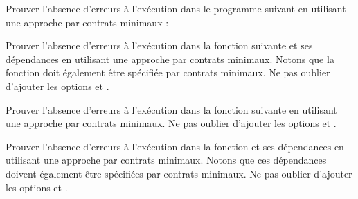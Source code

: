 



Prouver l'absence d'erreurs à l'exécution dans le programme suivant en utilisant
une approche par contrats minimaux :








Prouver l'absence d'erreurs à l'exécution dans la fonction 
suivante et ses dépendances en utilisant une approche par contrats minimaux.
Notons que la fonction  doit également être spécifiée par
contrats minimaux. Ne pas oublier d'ajouter les options
 et .








Prouver l'absence d'erreurs à l'exécution dans la fonction 
suivante en utilisant une approche par contrats minimaux. Ne pas oublier d'ajouter
les options  et
.








Prouver l'absence d'erreurs à l'exécution dans la fonction 
et ses dépendances en utilisant une approche par contrats minimaux. Notons que
ces dépendances doivent également être spécifiées par contrats minimaux. Ne pas
oublier d'ajouter les options  et
.




